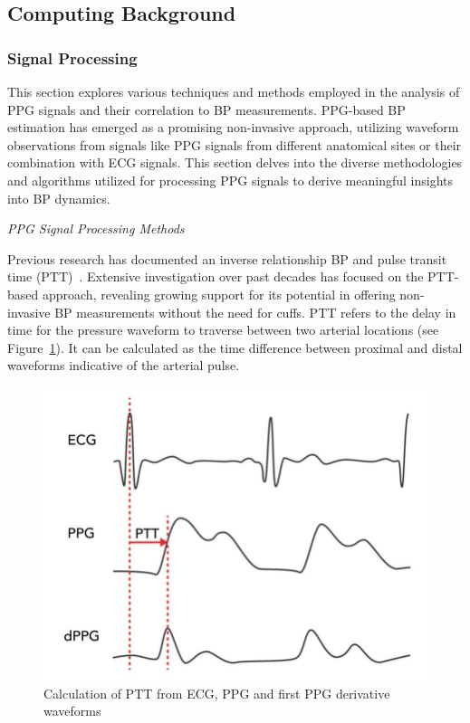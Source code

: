 \subsection{Computing Background}
\label{subsec:computing_background}

\subsubsection{Signal Processing}
\label{subsubsec:signal_processing}

This section explores various techniques and methods employed in the analysis of PPG signals and their correlation to BP measurements.
PPG-based BP estimation has emerged as a promising non-invasive approach, utilizing waveform observations from signals like PPG signals from different anatomical sites or their combination with ECG signals.
This section delves into the diverse methodologies and algorithms utilized for processing PPG signals to derive meaningful insights into BP dynamics.

\vspace{0.2cm}
\textit{PPG Signal Processing Methods}
\vspace{0.2cm}

Previous research has documented an inverse relationship BP and pulse transit time (PTT)~\cite{mukkamalaUbiquitousBloodPressure2015}.
Extensive investigation over past decades has focused on the PTT-based approach, revealing growing support for its potential in offering non-invasive BP measurements without the need for cuffs.
PTT refers to the delay in time for the pressure waveform to traverse between two arterial locations (see Figure~\ref{fig:ptt}).
It can be calculated as the time difference between proximal and distal waveforms indicative of the arterial pulse.
\begin{figure}[h]
    \centering
    \includegraphics[scale=0.4]{images/sp/ptt}
    \caption{Calculation of PTT from ECG, PPG and first PPG derivative waveforms~\cite{luiNovelCalibrationProcedure2018}}
    \label{fig:ptt}
\end{figure}

